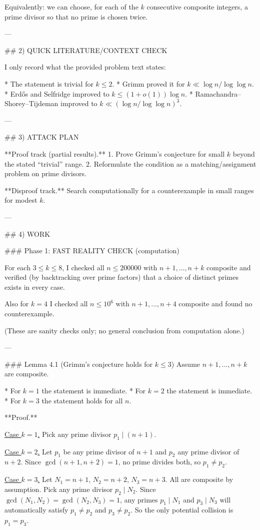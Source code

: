 Equivalently: we can choose, for each of the \(k\) consecutive composite integers, a prime divisor
so that no prime is chosen twice.

---

## 2) QUICK LITERATURE/CONTEXT CHECK

I only record what the provided problem text states:

* The statement is trivial for \(k\le 2\).
* Grimm proved it for \(k\ll \log n/\log\log n\).
* Erd\H{o}s and Selfridge improved to \(k\le (1+o(1))\log n\).
* Ramachandra–Shorey–Tijdeman improved to
  \(k\ll (\log n/\log\log n)^3\).

---

## 3) ATTACK PLAN

**Proof track (partial results).**
1. Prove Grimm’s conjecture for small \(k\) beyond the stated “trivial” range.
2. Reformulate the condition as a matching/assignment problem on prime divisors.

**Disproof track.**
Search computationally for a counterexample in small ranges for modest \(k\).

---

## 4) WORK

### Phase 1: FAST REALITY CHECK (computation)

For each \(3\le k\le 8\), I checked all \(n\le 200000\) with \(n+1,\dots,n+k\) composite and verified
(by backtracking over prime factors) that a choice of distinct primes exists in every case.

Also for \(k=4\) I checked all \(n\le 10^6\) with \(n+1,\dots,n+4\) composite and found no
counterexample.

(These are sanity checks only; no general conclusion from computation alone.)

---

### Lemma 4.1 (Grimm’s conjecture holds for \(k\le 3\))
Assume \(n+1,\dots,n+k\) are composite.

* For \(k=1\) the statement is immediate.
* For \(k=2\) the statement is immediate.
* For \(k=3\) the statement holds for all \(n\).

**Proof.**

\underline{Case \(k=1\).}
Pick any prime divisor \(p_1\mid (n+1)\).

\underline{Case \(k=2\).}
Let \(p_1\) be any prime divisor of \(n+1\) and \(p_2\) any prime divisor of \(n+2\).
Since \(\gcd(n+1,n+2)=1\), no prime divides both, so \(p_1\ne p_2\).

\underline{Case \(k=3\).}
Let \(N_1=n+1\), \(N_2=n+2\), \(N_3=n+3\). All are composite by assumption.
Pick any prime divisor \(p_2\mid N_2\).
Since \(\gcd(N_1,N_2)=\gcd(N_2,N_3)=1\), any primes \(p_1\mid N_1\) and \(p_3\mid N_3\)
will automatically satisfy \(p_1\ne p_2\) and \(p_3\ne p_2\). So the only potential collision is
\(p_1=p_3\).

